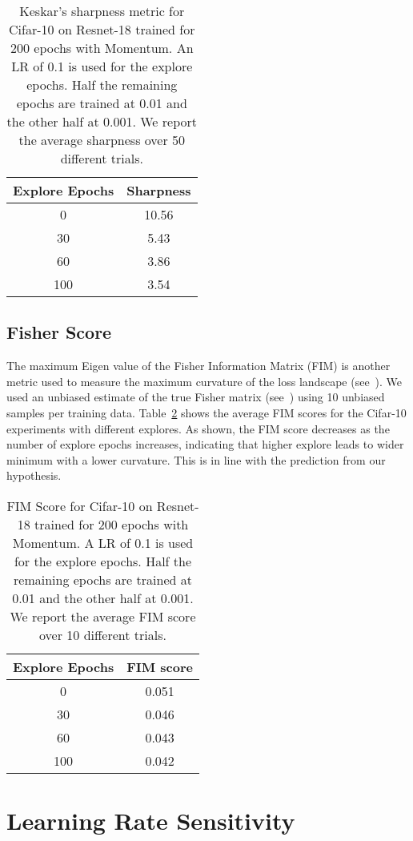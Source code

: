 \documentclass{article} \usepackage{iclr2021_conference,times}
\begin{document}
\begin{table}[h]
\small
\centering
\caption{Keskar's sharpness metric for Cifar-10 on Resnet-18 trained for 200
epochs with Momentum. An LR of 0.1 is used for the explore epochs. Half the remaining epochs are trained at 0.01 and the other half at 0.001. We report the average sharpness over 50 different trials.}
\begin{tabular}{cc}
  \toprule
  Explore Epochs       &  Sharpness \\
\midrule
  0 & 10.56\\
  30 & 5.43\\
  60 & 3.86\\
  100 & 3.54\\
 \bottomrule
\end{tabular}

\label{tab:keskar_avg}
\end{table}

\subsection{Fisher Score}
The maximum Eigen value of the Fisher Information Matrix (FIM) is another metric used to measure the maximum curvature of the loss landscape (see~\cite{fim2018information}). We used an unbiased estimate of the true Fisher matrix (see~\cite{empiricalfisher2019limitations}) using 10 unbiased samples per training data. Table~\ref{tab:fim_scores} shows the average FIM scores for the Cifar-10 experiments with different explores. As shown, the FIM score decreases as the number of explore epochs increases, indicating that higher explore leads to wider minimum with a lower curvature. This is in line with the prediction from our hypothesis.

\begin{table}[h]
\small
\centering
\caption{FIM Score for Cifar-10 on Resnet-18 trained for 200
epochs with Momentum. A LR of 0.1 is used for the explore epochs. Half the remaining epochs are trained at 0.01 and the other half at 0.001. We report the average FIM score over 10 different trials.}
\begin{tabular}{cc}
  \toprule
  Explore Epochs      &  FIM score   \\
\midrule
  0 & 0.051\\
  30 & 0.046\\
  60 & 0.043\\
  100 & 0.042\\
 \bottomrule
\end{tabular}
\label{tab:fim_scores}

\end{table} \section{Learning Rate Sensitivity}
\label{sec:seed_sensitivity}
\end{document}
